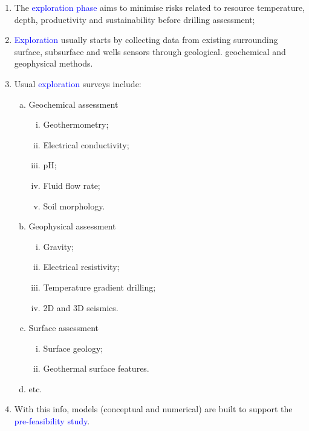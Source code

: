 \documentclass[10pt,compress]{beamer}
\newcommand{\blue}{\textcolor{blue}}
\begin{document}
\begin{frame}
\begin{frame}
    \begin{enumerate}[{2.}1]\scriptsize
       \item <1-> The \blue{exploration phase} aims to minimise risks related to resource temperature, depth, productivity and sustainability before drilling assessment;
       \item <2-> \blue{Exploration} usually starts by collecting data from existing surrounding surface, subsurface and wells sensors through geological. geochemical and geophysical methods.
       \item <3-> Usual \blue{exploration} surveys include:
          \begin{enumerate}[(a)]\scriptsize
             \item<4-> Geochemical assessment
                \begin{enumerate}[i)]\scriptsize
                   \item<4-> Geothermometry;
                   \item<4-> Electrical conductivity;
                   \item<4-> pH;
                   \item<4-> Fluid flow rate;
                   \item<4-> Soil morphology.
                \end{enumerate}
             \item<5-> Geophysical assessment
                \begin{enumerate}[i)]\scriptsize
                   \item<5-> Gravity;
                   \item<5-> Electrical resistivity;
                   \item<5-> Temperature gradient drilling;
                   \item<5-> 2D and 3D seismics.
                \end{enumerate}
             \item<6-> Surface assessment
                \begin{enumerate}[i)]\scriptsize
                   \item<6-> Surface geology;
                   \item<6-> Geothermal surface features.
                \end{enumerate}
             \item<7-> etc.
          \end{enumerate}
       \item <8-> With this info, models (conceptual and numerical) are built to support the \blue{pre-feasibility study}. 
    \end{enumerate}
\end{frame}
 


\end{frame}
\end{document}
